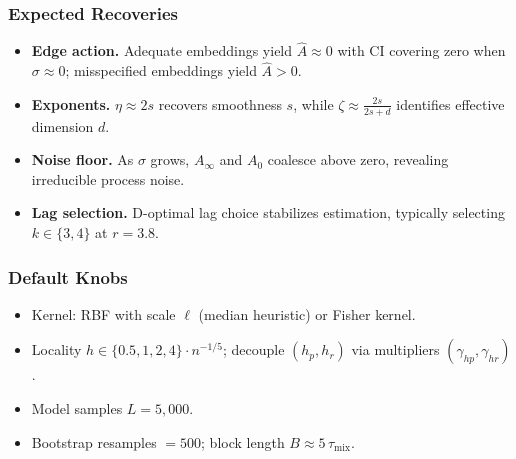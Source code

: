 \documentclass[11pt]{article}
\newcommand{\1}{\mathbf{1}}
\begin{document}
\subsubsection{Expected Recoveries}
\begin{itemize}
  \item \textbf{Edge action.} Adequate embeddings yield $\widehat{A}\approx 0$ with CI covering zero when $\sigma \approx 0$; misspecified embeddings yield $\widehat{A}>0$.
  \item \textbf{Exponents.} $\eta \approx 2s$ recovers smoothness $s$, while $\zeta \approx \tfrac{2s}{2s+d}$ identifies effective dimension $d$.
  \item \textbf{Noise floor.} As $\sigma$ grows, $A_\infty$ and $A_0$ coalesce above zero, revealing irreducible process noise.
  \item \textbf{Lag selection.} D-optimal lag choice stabilizes estimation, typically selecting $k\in\{3,4\}$ at $r{=}3.8$.
\end{itemize}

\subsubsection{Default Knobs}
\begin{itemize}
  \item Kernel: RBF with scale $\ell$ (median heuristic) or Fisher kernel.  
  \item Locality $h \in \{0.5,1,2,4\}\cdot n^{-1/5}$; decouple $(h_p,h_r)$ via multipliers $(\gamma_{hp},\gamma_{hr})$.  
  \item Model samples $L=5{,}000$.  
  \item Bootstrap resamples $=500$; block length $B \approx 5\,\tau_{\mathrm{mix}}$.  
\end{itemize}
\end{document}
